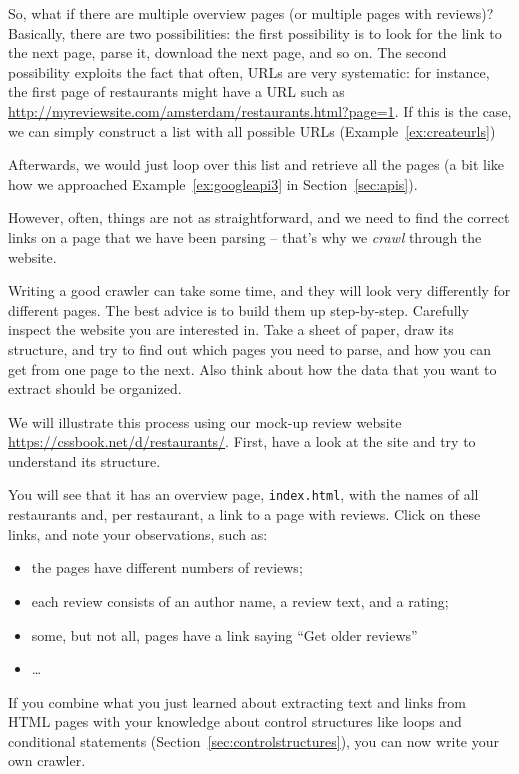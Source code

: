 So, what if there are multiple overview pages (or multiple pages with
reviews)? Basically, there are two possibilities: the first
possibility is to look for the link to the next page, parse it,
download the next page, and so on.  The second possibility exploits
the fact that often, URLs are very systematic: for instance, the first
page of restaurants might have a URL such as
\url{http://myreviewsite.com/amsterdam/restaurants.html?page=1}.  If this
is the case, we can simply construct a list with all possible URLs
(Example~\ref{ex:createurls})


Afterwards, we would just loop over this list and retrieve all the
pages (a bit like how we approached Example~\ref{ex:googleapi3} in Section~\ref{sec:apis}).

However, often, things are not as straightforward, and we need to find
the correct links on a page that we have been parsing -- that's why we
\emph{crawl} through the website.

Writing a good crawler can take some time, and they will look very
differently for different pages. The best advice is to build them up
step-by-step. Carefully inspect the website you are interested in.
Take a sheet of paper, draw its structure, and try to find out which
pages you need to parse, and how you can get from one page to the next.
Also think about how the data that you want to extract should be organized.

We will illustrate this process using our mock-up review website \url{https://cssbook.net/d/restaurants/}.
First, have a look at the site and try to understand its structure.

You will see that it has an overview page, \verb|index.html|, with the
names of all restaurants and, per restaurant, a link to a page with reviews.
Click on these links, and note your observations, such as:
\begin{itemize}
\item the pages have different numbers of reviews;
\item each review consists of an author name, a review text, and a rating;
\item some, but not all, pages have a link saying ``Get older reviews''
\item \ldots
\end{itemize}

If you combine what you just learned about extracting text and links from HTML
pages with your knowledge about control structures like loops and conditional
statements (Section~\ref{sec:controlstructures}), you can now write your own crawler.

